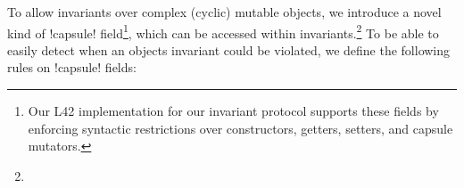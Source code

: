 To allow invariants over complex (cyclic) mutable objects, we introduce a novel kind of \Q!capsule! field\footnote{
Our L42 implementation for our invariant protocol supports these fields by enforcing syntactic
restrictions over constructors, getters, setters, and capsule mutators.}, which can be accessed within invariants.\footnote{}
To be able to easily detect when an objects invariant could be violated, we define the following rules on \Q!capsule! fields:\SS
